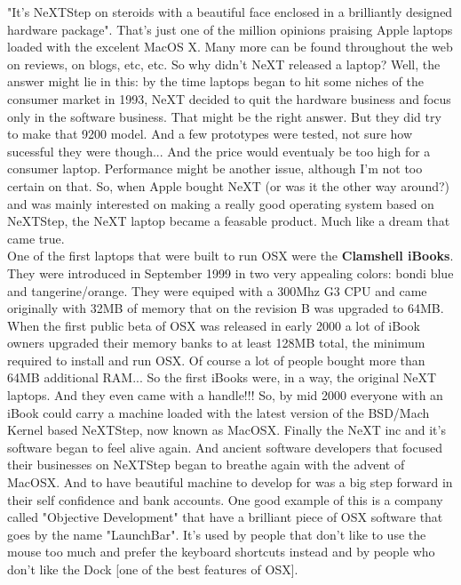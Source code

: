 \documentclass[11pt,twoside,a4paper]{book}
\begin{document}
\begin{multicols*}{2}
"It's NeXTStep on steroids with a beautiful face enclosed in a brilliantly designed hardware package". That's just one of the million opinions praising Apple laptops loaded with the excelent MacOS X. Many more can be found throughout the web on reviews, on blogs, etc, etc. So why didn't NeXT released a laptop? Well, the answer might lie in this: by the time laptops began to hit some niches of the consumer market in 1993, NeXT decided to quit the hardware business and focus only in the software business. That might be the right answer. But they did try to make that 9200 model. And a few prototypes were tested, not sure how sucessful they were though... And the price would eventualy be too high for a consumer laptop. Performance might be another issue, although I'm not too certain on that. So, when Apple bought NeXT (or was it the other way around?) and was mainly interested on making a really good operating system based on NeXTStep, the NeXT laptop became a feasable product. Much like a dream that came true. ~\\


One of the first laptops that were built to run OSX were the \textbf{Clamshell iBooks}. They were introduced in September 1999 in two very appealing colors: bondi blue and tangerine/orange. They were equiped with a 300Mhz G3 CPU and came originally with 32MB of memory that on the revision B was upgraded to 64MB. When the first public beta of OSX was released in early 2000 a lot of iBook owners upgraded their memory banks to at least 128MB total, the minimum required to install and run OSX. Of course a lot of people bought more than 64MB additional RAM... So the first iBooks were, in a way, the original NeXT laptops. And they even came with a handle!!! So, by mid 2000 everyone with an iBook could carry a machine loaded with the latest version of the BSD/Mach Kernel based NeXTStep, now known as MacOSX. Finally the NeXT inc and it's software began to feel alive again. And ancient software developers that focused their businesses on NeXTStep began to breathe again with the advent of MacOSX. And to have beautiful machine to develop for was a big step forward in their self confidence and bank accounts. One good example of this is a company called "Objective Development" that have a brilliant piece of OSX software that goes by the name "LaunchBar". It's used by people that don't like to use the mouse too much and prefer the keyboard shortcuts instead and by people who don't like the Dock [one of the best features of OSX]. ~\\


\end{multicols*}
\end{document}
